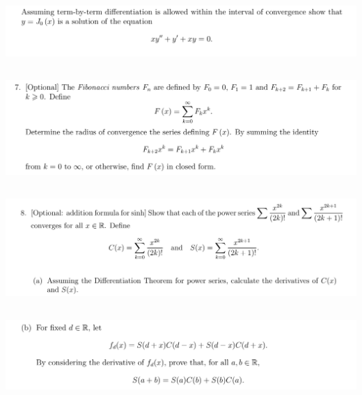 \documentclass[12pt]{article}
\begin{document}
\begin{mdframed}
\includegraphics[width=400pt]{img/analysis--oxford-M2-I-7-6-b.png}
\end{mdframed}

\newpage
\subsection{}
\begin{mdframed}
\includegraphics[width=400pt]{img/analysis--oxford-M2-I-7-7.png}
\end{mdframed}

\newpage
\subsection{}
\begin{mdframed}
\includegraphics[width=400pt]{img/analysis--oxford-M2-I-7-8-a.png}
\end{mdframed}

\newpage
\subsection{}
\begin{mdframed}
\includegraphics[width=400pt]{img/analysis--oxford-M2-I-7-8-b.png}
\end{mdframed}
\end{document}
